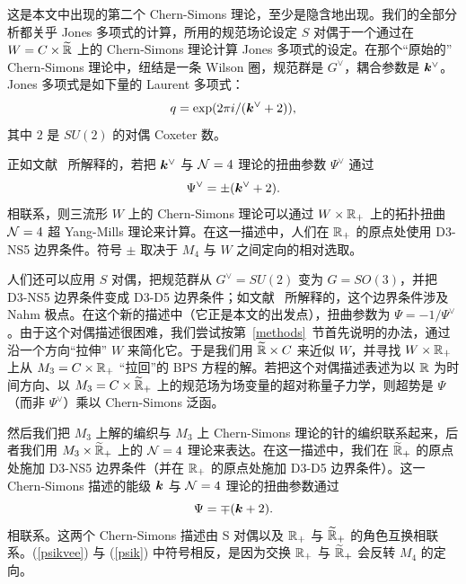 这是本文中出现的第二个 Chern-Simons 理论，至少是隐含地出现。我们的全部分析都关乎 Jones 多项式的计算，所用的规范场论设定 $S$ 对偶于一个通过在 $W = C \times \widetilde {{\mathbb R}}$ 上的 Chern-Simons 理论计算 Jones 多项式的设定。在那个“原始的” Chern-Simons 理论中，纽结是一条 Wilson 圈，规范群是 $G^\vee$，耦合参数是 ${\boldsymbol{k}}^\vee$。Jones 多项式是如下量的 Laurent 多项式：
\begin{equation}\label{torg} q=\exp(2\pi i/({\boldsymbol{k}}^\vee+2)),\end{equation}
其中 $2$ 是 $SU(2)$ 的对偶 Coxeter 数。

正如文献~\cite{fiveknots} 所解释的，若把 ${\boldsymbol{k}}^\vee$ 与 ${\mathcal N}=4$ 理论的扭曲参数 $\Psi^\vee$ 通过
\begin{equation} \label{psikvee} \Psi^\vee=\pm ({\boldsymbol{k}}^\vee+2). \end{equation}
相联系，则三流形 $W$ 上的 Chern-Simons 理论可以通过 $W\times {\mathbb R}_+$ 上的拓扑扭曲 ${\mathcal N}=4$ 超 Yang-Mills 理论来计算。在这一描述中，人们在 ${\mathbb R}_+$ 的原点处使用 D3-NS5 边界条件。符号 $\pm$ 取决于 $M_4$ 与 $W$ 之间定向的相对选取。

人们还可以应用 $S$ 对偶，把规范群从 $G^\vee=SU(2)$ 变为 $G=SO(3)$，并把 D3-NS5 边界条件变成 D3-D5 边界条件；如文献~\cite{gw} 所解释的，这个边界条件涉及 Nahm 极点。在这个新的描述中（它正是本文的出发点），扭曲参数为 $\Psi=-1/\Psi^\vee$。由于这个对偶描述很困难，我们尝试按第~\ref{methods}~节首先说明的办法，通过沿一个方向“拉伸” $W$ 来简化它。于是我们用 $\widetilde {{\mathbb R}}\times C$ 来近似 $W$，并寻找 $W\times {\mathbb R}_+$ 上从 $M_3=C\times {\mathbb R}_+$ “拉回”的 BPS 方程的解。若把这个对偶描述表述为以 ${\mathbb R}$ 为时间方向、以 $M_3=C\times \widetilde {{\mathbb R}}_+$ 上的规范场为场变量的超对称量子力学，则超势是 $\Psi$（而非 $\Psi^\vee$）乘以 Chern-Simons 泛函。

然后我们把 $M_3$ 上解的编织与 $M_3$ 上 Chern-Simons 理论的针的编织联系起来，后者我们用 $M_3\times \widetilde {{\mathbb R}}_+$ 上的 ${\mathcal N}=4$ 理论来表达。在这一描述中，我们在 $\widetilde {{\mathbb R}}_+$ 的原点处施加 D3-NS5 边界条件（并在 ${\mathbb R}_+$ 的原点处施加 D3-D5 边界条件）。这一 Chern-Simons 描述的能级 ${\boldsymbol{k}}$ 与 ${\mathcal N}=4$ 理论的扭曲参数通过
\begin{equation} \label{psik} \Psi=\mp ({\boldsymbol{k}}+2). \end{equation}
相联系。这两个 Chern-Simons 描述由 S 对偶以及 ${\mathbb R}_+$ 与 $\widetilde {{\mathbb R}}_+$ 的角色互换相联系。(\ref{psikvee}) 与 (\ref{psik}) 中符号相反，是因为交换 ${\mathbb R}_+$ 与 $\widetilde {{\mathbb R}}_+$ 会反转 $M_4$ 的定向。

